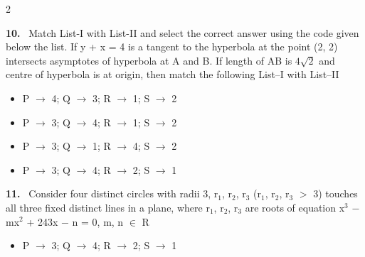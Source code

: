 \documentclass[10pt]{extarticle}
\newcommand{\qn}[1]{\par\smallskip\noindent\textbf{#1.}~}
\newenvironment{qoptions}{\begin{itemize}[leftmargin=1.8em,itemsep=1pt,topsep=2pt,label={}]}{\end{itemize}}
\newcommand{\opt}[2]{\item[(#1)] #2}
\begin{document}
\begin{multicols}{2}
\begin{qoptions}
\end{qoptions}
\qn{10} Match List-I with List-II and select the correct answer using the code given below the list. If y + x = 4 is a tangent to the hyperbola at the point (2, 2) intersects asymptotes of hyperbola at A and B. If length of AB is $4\sqrt2$ and centre of hyperbola is at origin, then match the following List--I with List--II\par
{}\par
\begin{qoptions}
\opt{A}{P $\to$ 4; Q $\to$ 3; R $\to$ 1; S $\to$ 2}
\opt{B}{P $\to$ 3; Q $\to$ 4; R $\to$ 1; S $\to$ 2}
\opt{C}{P $\to$ 3; Q $\to$ 1; R $\to$ 4; S $\to$ 2}
\opt{D}{P $\to$ 3; Q $\to$ 4; R $\to$ 2; S $\to$ 1}
\end{qoptions}
\qn{11} Consider four distinct circles with radii 3, r$_1$, r$_2$, r$_3$ (r$_1$, r$_2$, r$_3$ $>$ 3) touches all three fixed distinct lines in a plane, where r$_1$, r$_2$, r$_3$ are roots of equation x$^3$ $-$ mx$^2$ + 243x $-$ n = 0, m, n $\in$ R\par
{}\par
\begin{qoptions}
\opt{A}{P $\to$ 3; Q $\to$ 4; R $\to$ 2; S $\to$ 1}

\end{qoptions}
\end{multicols}
\end{document}
